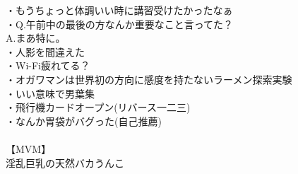 ・もうちょっと体調いい時に講習受けたかったなぁ\\
・Q.午前中の最後の方なんか重要なこと言ってた？\\
    A.まあ特に。\\
・人影を間違えた\\
・Wi-Fi疲れてる？\\
・オガワマンは世界初の方向に感度を持たないラーメン探索実験\\
・いい意味で男葉集\\
・飛行機カードオープン(リバース一二三)\\
・なんか胃袋がバグった(自己推薦)\\
 \\
【MVM】\\
淫乱巨乳の天然バカうんこ\\

\newpage
